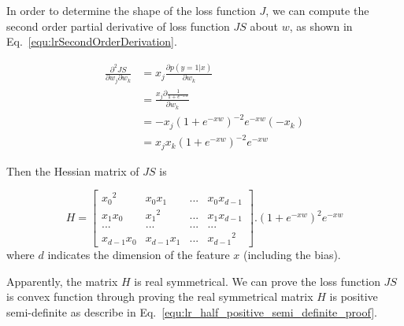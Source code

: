 \documentclass[runningheads,openany]{xhlPaper}
\begin{document}
In order to determine the shape of the loss function $J$, we can compute the second order partial derivative of loss function $JS$ about $w$, as shown in Eq.~\ref{equ:lrSecondOrderDerivation}. 

\begin{equation}
\label{equ:lrSecondOrderDerivation}
\begin{aligned}
\frac{{{\partial ^2}JS}}{{\partial {w_j}\partial {w_k}}} &= {x_j}\frac{{\partial p\left( {y = 1|x} \right)}}{{\partial {w_k}}}\\
 &= \frac{{{x_j}\partial \frac{1}{{1 + {e^{ - xw}}}}}}{{\partial {w_k}}}\\
 &=  - {x_j}{\left( {1 + {e^{ - xw}}} \right)^{ - 2}}{e^{ - xw}}\left( { - {x_k}} \right)\\
 &= {x_j}{x_k}{\left( {1 + {e^{ - xw}}} \right)^{ - 2}}{e^{ - xw}}
\end{aligned}
\end{equation}

Then the Hessian matrix of $JS$ is 

\begin{displaymath}
\label{equ:lr_hessian_matrix_loss}
H = \left[ {\begin{array}{*{20}{c}}
{{x_0}^2}&{{x_0}{x_1}}&{...}&{{x_0}{x_{d - 1}}}\\
{{x_1}{x_0}}&{{x_1}^2}&{...}&{{x_1}{x_{d - 1}}}\\
{...}&{...}&{...}&{...}\\
{{x_{d - 1}}{x_0}}&{{x_{d - 1}}{x_1}}&{...}&{{x_{d - 1}}^2}
\end{array}} \right].{\left( {1 + {e^{ - xw}}} \right)^2}{e^{ - xw}}
\end{displaymath}
where $d$ indicates the dimension of the feature $x$ (including the bias).

Apparently, the matrix $H$ is real symmetrical. We can prove the loss function $JS$ is convex function through proving the real symmetrical matrix $H$ is positive semi-definite as describe in Eq.~\ref{equ:lr_half_positive_semi_definite_proof}.
\end{document}
